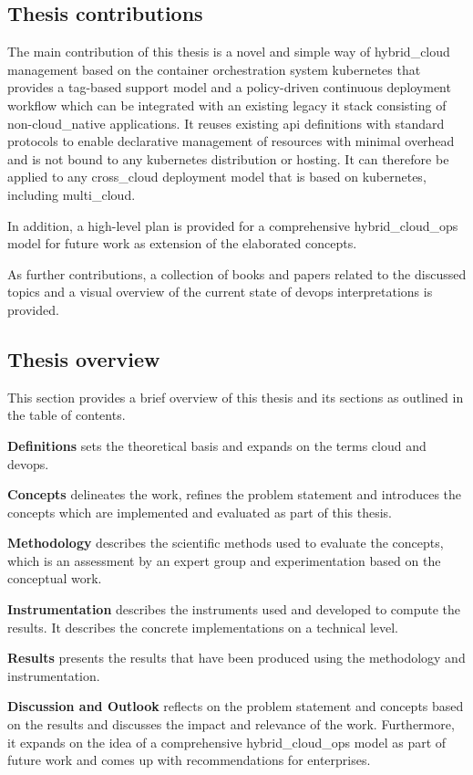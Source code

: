 \documentclass[../main.tex]{subfiles}
\begin{document}
    \subsection{Thesis contributions}
    \label{subsec:contributions}

    The main contribution of this thesis is a novel and simple way of \gls{hybrid_cloud} management based on the container orchestration system \gls{kubernetes} that provides a tag-based support model and a policy-driven continuous deployment workflow which can be integrated with an existing legacy \acrshort{it} stack consisting of non-\gls{cloud_native} applications.
    It reuses existing \acrshort{api} definitions with standard protocols to enable declarative management of resources with minimal overhead and is not bound to any \gls{kubernetes} distribution or hosting.
    It can therefore be applied to any \gls{cross_cloud} deployment model that is based on \gls{kubernetes}, including \gls{multi_cloud}.

    In addition, a high-level plan is provided for a comprehensive \gls{hybrid_cloud_ops} model for future work as extension of the elaborated concepts.

    As further contributions, a collection of books and papers related to the discussed topics and a visual overview of the current state of \gls{devops} interpretations is provided.

    \subsection{Thesis overview}
    \label{subsec:thesis-overview}

    This section provides a brief overview of this thesis and its sections as outlined in the table of contents.

    \textbf{Definitions}
    sets the theoretical basis and expands on the terms \gls{cloud} and \gls{devops}.

    \textbf{Concepts}
    delineates the work, refines the problem statement and introduces the concepts which are implemented and evaluated as part of this thesis.

    \textbf{Methodology}
    describes the scientific methods used to evaluate the concepts, which is an assessment by an expert group and experimentation based on the conceptual work.

    \textbf{Instrumentation}
    describes the instruments used and developed to compute the results.
    It describes the concrete implementations on a technical level.

    \textbf{Results}
    presents the results that have been produced using the methodology and instrumentation.

    \textbf{Discussion and Outlook}
    reflects on the problem statement and concepts based on the results and discusses the impact and relevance of the work.
    Furthermore, it expands on the idea of a comprehensive \gls{hybrid_cloud_ops} model as part of future work and comes up with recommendations for enterprises.
\end{document}
